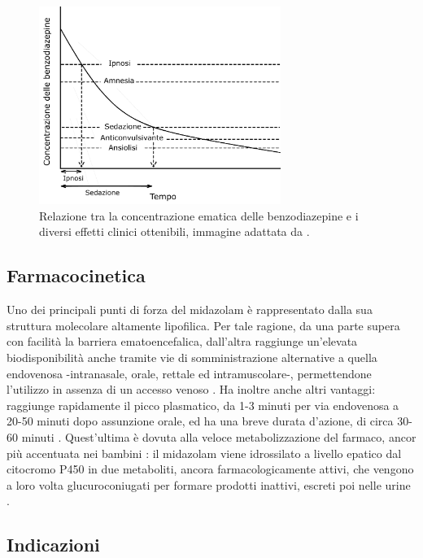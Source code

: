 \begin{figure}[!h]
    \centering
    \includegraphics[width=0.7\textwidth]{Figure/figurabenzo.pdf}
    \caption{Relazione tra la concentrazione ematica delle benzodiazepine e i diversi effetti clinici ottenibili, immagine adattata da \cite{Olkkola2008}.}
    \label{fig:benzo}
\end{figure}

\subsection*{Farmacocinetica}

Uno dei principali punti di forza del midazolam è rappresentato dalla sua struttura molecolare altamente lipofilica. Per tale ragione, da una parte supera con facilità la barriera ematoencefalica, dall'altra raggiunge un'elevata biodisponibilità anche tramite vie di somministrazione alternative a quella endovenosa -intranasale, orale, rettale ed intramuscolare-, permettendone l'utilizzo in assenza di un accesso venoso \cite{Krauss2006}. Ha inoltre anche altri vantaggi: raggiunge rapidamente il picco plasmatico, da 1-3 minuti per via endovenosa a 20-50 minuti dopo assunzione orale, ed ha una breve durata d'azione, di circa 30-60 minuti \cite{Simeupsedazione, Uptodatepharmacology}. 
Quest'ultima è dovuta alla veloce metabolizzazione del farmaco, ancor più accentuata nei bambini \cite{Payne1989}: il midazolam viene idrossilato a livello epatico dal citocromo P450 in due metaboliti, ancora farmacologicamente attivi, che vengono a loro volta glucuroconiugati per formare prodotti inattivi, escreti poi nelle urine \cite{Olkkola2008}. 

\subsection*{Indicazioni}


